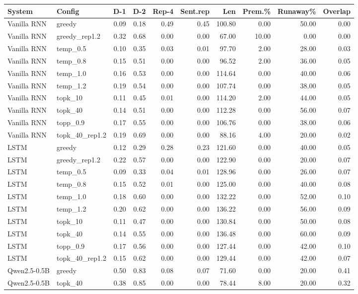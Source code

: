 \begin{tabular}{llrrrrrrrr}
\toprule
System & Config & D-1 & D-2 & Rep-4 & Sent.rep & Len & Prem.\% & Runaway\% & Overlap \\
\midrule
Vanilla RNN & greedy & 0.09 & 0.18 & 0.49 & 0.45 & 100.80 & 0.00 & 50.00 & 0.00 \\
Vanilla RNN & greedy\_rep1.2 & 0.32 & 0.68 & 0.00 & 0.00 & 67.00 & 10.00 & 0.00 & 0.00 \\
Vanilla RNN & temp\_0.5 & 0.10 & 0.35 & 0.03 & 0.01 & 97.70 & 2.00 & 28.00 & 0.03 \\
Vanilla RNN & temp\_0.8 & 0.15 & 0.51 & 0.00 & 0.00 & 96.52 & 2.00 & 36.00 & 0.05 \\
Vanilla RNN & temp\_1.0 & 0.16 & 0.53 & 0.00 & 0.00 & 114.64 & 0.00 & 40.00 & 0.06 \\
Vanilla RNN & temp\_1.2 & 0.19 & 0.54 & 0.00 & 0.00 & 107.74 & 0.00 & 38.00 & 0.05 \\
Vanilla RNN & topk\_10 & 0.11 & 0.45 & 0.01 & 0.00 & 114.20 & 2.00 & 44.00 & 0.05 \\
Vanilla RNN & topk\_40 & 0.14 & 0.51 & 0.00 & 0.00 & 112.28 & 0.00 & 56.00 & 0.07 \\
Vanilla RNN & topp\_0.9 & 0.17 & 0.55 & 0.00 & 0.00 & 106.76 & 0.00 & 38.00 & 0.06 \\
Vanilla RNN & topk\_40\_rep1.2 & 0.19 & 0.69 & 0.00 & 0.00 & 88.16 & 4.00 & 20.00 & 0.02 \\
LSTM & greedy & 0.12 & 0.29 & 0.28 & 0.23 & 121.60 & 0.00 & 40.00 & 0.05 \\
LSTM & greedy\_rep1.2 & 0.22 & 0.57 & 0.00 & 0.00 & 122.90 & 0.00 & 20.00 & 0.07 \\
LSTM & temp\_0.5 & 0.09 & 0.33 & 0.04 & 0.01 & 128.96 & 0.00 & 26.00 & 0.07 \\
LSTM & temp\_0.8 & 0.15 & 0.52 & 0.01 & 0.00 & 125.00 & 0.00 & 40.00 & 0.08 \\
LSTM & temp\_1.0 & 0.18 & 0.60 & 0.00 & 0.00 & 132.22 & 0.00 & 52.00 & 0.10 \\
LSTM & temp\_1.2 & 0.20 & 0.62 & 0.00 & 0.00 & 136.22 & 0.00 & 56.00 & 0.09 \\
LSTM & topk\_10 & 0.11 & 0.47 & 0.00 & 0.00 & 130.84 & 0.00 & 50.00 & 0.08 \\
LSTM & topk\_40 & 0.14 & 0.55 & 0.00 & 0.00 & 136.48 & 0.00 & 60.00 & 0.09 \\
LSTM & topp\_0.9 & 0.17 & 0.56 & 0.00 & 0.00 & 127.44 & 0.00 & 42.00 & 0.10 \\
LSTM & topk\_40\_rep1.2 & 0.15 & 0.62 & 0.00 & 0.00 & 129.44 & 0.00 & 42.00 & 0.07 \\
Qwen2.5-0.5B & greedy & 0.50 & 0.83 & 0.08 & 0.07 & 71.60 & 0.00 & 20.00 & 0.41 \\
Qwen2.5-0.5B & topk\_40 & 0.38 & 0.85 & 0.00 & 0.00 & 78.44 & 8.00 & 20.00 & 0.32 \\
\bottomrule
\end{tabular}
